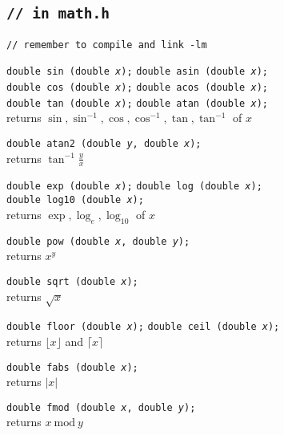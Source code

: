\documentclass[8pt]{article}
\newcommand{\Cc}[1]{\texttt{#1}}
\newcommand{\cmt}[1]{\textcolor[gray]{.3}{\texttt{#1}}} %
\newcommand{\ty}[1]{\textcolor{blue!80}{\texttt{#1}}} %
\newcommand{\fn}[1]{\texttt{#1}} %
\newcommand{\var}[1]{\texttt{\textit{#1}}} %
\newcommand{\htab}{\hspace*{2em}} %
\begin{document}
\begin{multicols}{3}
\subsection*{\Cc{\cmt{// in math.h}}}
\Cc{\cmt{// remember to compile and link -lm}}

\Cc{\ty{double} \fn{sin}\,(\ty{double} \var{x});} \hfill
\Cc{\ty{double} \fn{asin}\,(\ty{double} \var{x});} \\
\Cc{\ty{double} \fn{cos}\,(\ty{double} \var{x});} \hfill
\Cc{\ty{double} \fn{acos}\,(\ty{double} \var{x});} \\
\Cc{\ty{double} \fn{tan}\,(\ty{double} \var{x});} \hfill
\Cc{\ty{double} \fn{atan}\,(\ty{double} \var{x});} \\
\htab returns $\sin,\sin^{-1},\cos,\cos^{-1},\tan,\tan^{-1}$ of $x$

\Cc{\ty{double} \fn{atan2}\,(\ty{double} \var{y}, \ty{double} \var{x});} \\
\htab returns $\tan^{-1} \frac{y}{x}$


\Cc{\ty{double} \fn{exp}\,(\ty{double} \var{x});} \hfill
\Cc{\ty{double} \fn{log}\,(\ty{double} \var{x});} \\
\Cc{\ty{double} \fn{log10}\,(\ty{double} \var{x});} \\
\htab returns $\exp,\log_{e},\log_{10}$ of $x$

\Cc{\ty{double} \fn{pow}\,(\ty{double} \var{x}, \ty{double} \var{y});} \\
\htab returns $x^y$

\Cc{\ty{double} \fn{sqrt}\,(\ty{double} \var{x});} \\
\htab returns $\sqrt{x}$

\Cc{\ty{double} \fn{floor}\,(\ty{double} \var{x});} \hfill
\Cc{\ty{double} \fn{ceil}\,(\ty{double} \var{x});} \\
\htab returns $\lfloor x\rfloor$ and $\lceil x\rceil$

\Cc{\ty{double} \fn{fabs}\,(\ty{double} \var{x});} \\
\htab returns $\left|x\right|$

\Cc{\ty{double} \fn{fmod}\,(\ty{double} \var{x}, \ty{double} \var{y});} \\
\htab returns $x~\textrm{mod}~y$



\end{multicols}
\end{document}
